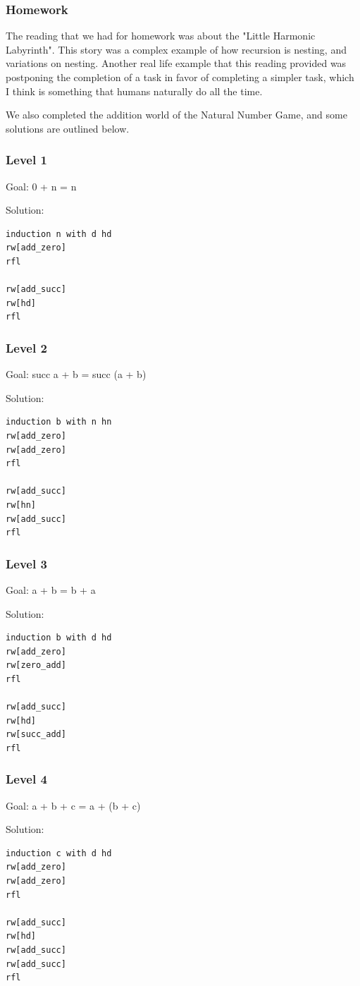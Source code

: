 \documentclass{article}
\theoremstyle{theorem}
\theoremstyle{definition}
\theoremstyle{remark}
\begin{document}
\subsubsection*{Homework}
The reading that we had for homework was about the "Little Harmonic Labyrinth". This story was a complex example of how
recursion is nesting, and variations on nesting. Another real life example that this reading provided was postponing the 
completion of a task in favor of completing a simpler task, which I think is something that humans naturally do all the time.

We also completed the addition world of the Natural Number Game, and some solutions are outlined below.
\subsubsection*{Level 1}
Goal: 0 + n = n

Solution:
\begin{lstlisting}
induction n with d hd
rw[add_zero]
rfl

rw[add_succ]
rw[hd]
rfl
\end{lstlisting}
\subsubsection*{Level 2}
Goal: succ a + b = succ (a + b)

Solution:
\begin{lstlisting}
induction b with n hn
rw[add_zero]
rw[add_zero]
rfl

rw[add_succ]
rw[hn]
rw[add_succ]
rfl
\end{lstlisting}
\subsubsection*{Level 3}
Goal: a + b = b + a

Solution:
\begin{lstlisting}
induction b with d hd
rw[add_zero]
rw[zero_add]
rfl

rw[add_succ]
rw[hd]
rw[succ_add]
rfl
\end{lstlisting}
\subsubsection*{Level 4}
Goal: a + b + c = a + (b + c)

Solution:
\begin{lstlisting}
induction c with d hd
rw[add_zero]
rw[add_zero]
rfl

rw[add_succ]
rw[hd]
rw[add_succ]
rw[add_succ]
rfl
\end{lstlisting}
\end{document}
